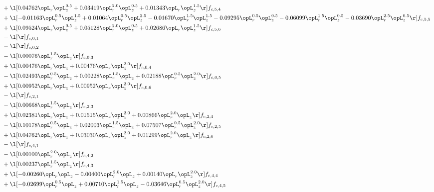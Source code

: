 \begin{alignat}{2}
& + \l[  0.04762 \opL_r \opL_z^{0.5} +  0.03419 \opL_r^{2.0} \opL_z^{0.5} +  0.01343 \opL_r \opL_z^{1.5}  \r] f_{c,5,4} \nonumber \\ 
& + \l[  -0.01163 \opL_r^{0.5} \opL_z^{1.5} +  0.01064 \opL_r^{0.5} \opL_z^{2.5}   -0.01670 \opL_r^{1.5} \opL_z^{1.5}   -0.09295 \opL_r^{0.5} \opL_z^{0.5}   -0.06099 \opL_r^{1.5} \opL_z^{0.5}   -0.03690 \opL_r^{2.5} \opL_z^{0.5}  \r] f_{c,5,5} \nonumber \\ 
& + \l[  0.09524 \opL_r \opL_z^{0.5} +  0.05128 \opL_r^{2.0} \opL_z^{0.5} +  0.02686 \opL_r \opL_z^{1.5}  \r] f_{c,5,6} \nonumber \\ 
& - \l[  \r] f_{c,0,1} \nonumber \\ 
& - \l[  \r] f_{c,0,2} \nonumber \\ 
& - \l[  0.00076 \opL_r^{1.5} \opL_z  \r] f_{c,0,3} \nonumber \\ 
& + \l[  0.00476 \opL_r \opL_z +  0.00476 \opL_r \opL_z^{2.0}  \r] f_{c,0,4} \nonumber \\ 
& - \l[  0.02493 \opL_r^{0.5} \opL_z +  0.00228 \opL_r^{1.5} \opL_z +  0.02188 \opL_r^{0.5} \opL_z^{2.0}  \r] f_{c,0,5} \nonumber \\ 
& + \l[  0.00952 \opL_r \opL_z +  0.00952 \opL_r \opL_z^{2.0}  \r] f_{c,0,6} \nonumber \\ 
& - \l[  \r] f_{c,2,1} \nonumber \\ 
& - \l[  0.00668 \opL_r^{1.5} \opL_z  \r] f_{c,2,3} \nonumber \\ 
& + \l[  0.02381 \opL_r \opL_z +  0.01515 \opL_r \opL_z^{2.0} +  0.00866 \opL_r^{2.0} \opL_z  \r] f_{c,2,4} \nonumber \\ 
& - \l[  0.10178 \opL_r^{0.5} \opL_z +  0.02003 \opL_r^{1.5} \opL_z +  0.07507 \opL_r^{0.5} \opL_z^{2.0}  \r] f_{c,2,5} \nonumber \\ 
& + \l[  0.04762 \opL_r \opL_z +  0.03030 \opL_r \opL_z^{2.0} +  0.01299 \opL_r^{2.0} \opL_z  \r] f_{c,2,6} \nonumber \\ 
& - \l[  \r] f_{c,4,1} \nonumber \\ 
& - \l[  0.00100 \opL_r^{2.0} \opL_z  \r] f_{c,4,2} \nonumber \\ 
& + \l[  0.00237 \opL_r^{1.5} \opL_z  \r] f_{c,4,3} \nonumber \\ 
& + \l[  -0.00260 \opL_r \opL_z   -0.00400 \opL_r^{2.0} \opL_z +  0.00140 \opL_r \opL_z^{2.0}  \r] f_{c,4,4} \nonumber \\ 
& + \l[  -0.02699 \opL_r^{0.5} \opL_z +  0.00710 \opL_r^{1.5} \opL_z   -0.03646 \opL_r^{0.5} \opL_z^{2.0}  \r] f_{c,4,5} \nonumber \\ 

\end{alignat}
